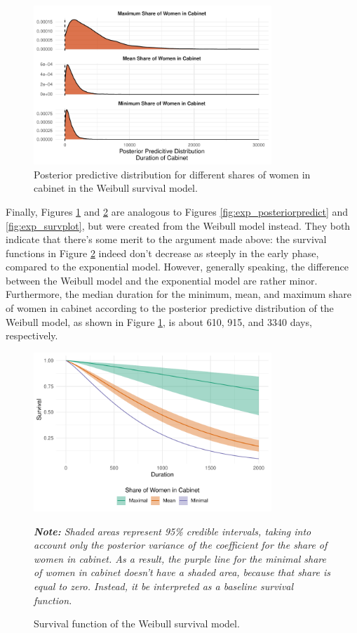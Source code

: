 \documentclass[11pt]{article}
\newcommand\fnote[1]{\captionsetup{font=footnotesize}\caption*{\textit{#1}}}
\newcommand\minp[1]{\begin{minipage}{0.8\textwidth} #1 \end{minipage}}
\begin{document}
\begin{figure}[!ht]
    \centering
    \minp{\caption{Posterior predictive distribution for different shares of women in cabinet in the Weibull survival model.} \label{fig:weib_posteriorpredict}}
    \includegraphics[width = 0.8\textwidth]{figures/fig3_weib_posteriorpredict.pdf}
\end{figure}

Finally, Figures \ref{fig:weib_posteriorpredict} and \ref{fig:weib_survplot} are analogous to Figures \ref{fig:exp_posteriorpredict} and \ref{fig:exp_survplot}, but were created from the Weibull model instead. They both indicate that there's some merit to the argument made above: the survival functions in Figure \ref{fig:weib_survplot} indeed don't decrease as steeply in the early phase, compared to the exponential model. However, generally speaking, the difference between the Weibull model and the exponential model are rather minor. Furthermore, the median duration for the minimum, mean, and maximum share of women in cabinet according to the posterior predictive distribution of the Weibull model, as shown in Figure \ref{fig:weib_posteriorpredict}, is about 610, 915, and 3340 days, respectively. 

\begin{figure}[!ht]
    \centering
    \minp{\caption{Survival function of the Weibull survival model.} \label{fig:weib_survplot}}
    \includegraphics[width = 0.8\textwidth]{figures/fig4_weib_survplot.pdf}
    \minp{\fnote{\textbf{Note:} Shaded areas represent 95\% credible intervals, taking into account only the posterior variance of the coefficient for the share of women in cabinet. As a result, the purple line for the minimal share of women in cabinet doesn't have a shaded area, because that share is equal to zero. Instead, it be interpreted as a baseline survival function.}}
\end{figure}
\end{document}
